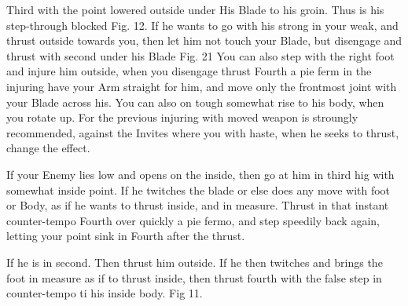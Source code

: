 \newpage


\newpage



Third with the point lowered outside under His Blade to his
groin. Thus is his step-through blocked Fig. 12. If he wants to go
with his strong in your weak, and thrust outside towards you, then let
him not touch your Blade, but disengage and thrust with second under
his Blade Fig. 21 You can also step with the right foot and injure him
outside, when you disengage thrust Fourth a pie ferm in the injuring
have your Arm straight for him, and move only the frontmost joint with
your Blade across
his. You can also on tough somewhat rise to his body, when you rotate
up. For the previous injuring with moved weapon is stroungly
recommended, against the Invites where you with haste, when he seeks
to thrust, change the effect.

\exercise{}


If your Enemy lies low and opens on the inside, then go at him in
third hig with somewhat inside point. If he twitches the blade or else
does any move with foot or Body, as if he wants to thrust inside, and
in measure. Thrust in that instant counter-tempo Fourth over quickly a
pie fermo, and step speedily back again, letting your point sink in
Fourth after the thrust.

\exercise{}


If he is in second. Then thrust him outside. If he then twitches and
brings the foot in measure as if to thrust inside, then thrust fourth
with the false step in counter-tempo ti his inside body. Fig 11.
